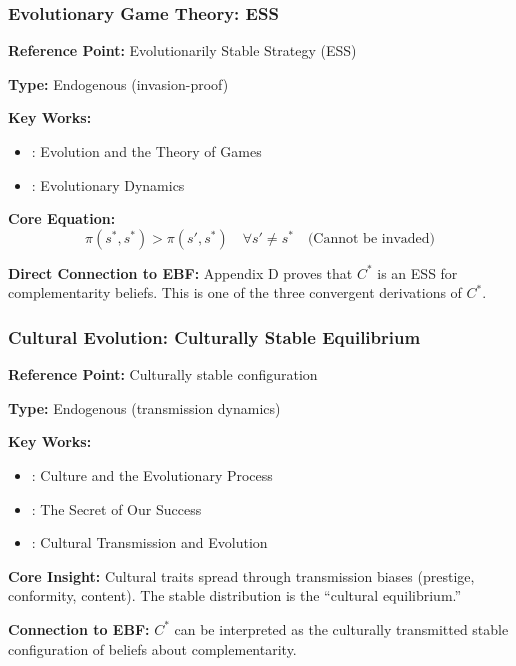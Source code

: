 \subsubsection{Evolutionary Game Theory: ESS}

\begin{tcolorbox}[colback=gray!5!white, colframe=gray!75!black]
\textbf{Reference Point:} Evolutionarily Stable Strategy (ESS)

\textbf{Type:} Endogenous (invasion-proof)

\textbf{Key Works:}
\begin{itemize}[nosep]
    \item \citet{maynardsmith1982}: Evolution and the Theory of Games
    \item \citet{nowak2006}: Evolutionary Dynamics
\end{itemize}

\textbf{Core Equation:}
\begin{equation}
\pi(s^*, s^*) > \pi(s', s^*) \quad \forall s' \neq s^* \quad \text{(Cannot be invaded)}
\end{equation}

\textbf{Direct Connection to EBF:}
Appendix D proves that $C^*$ is an ESS for complementarity beliefs.
This is one of the three convergent derivations of $C^*$.
\end{tcolorbox}

\subsubsection{Cultural Evolution: Culturally Stable Equilibrium}

\begin{tcolorbox}[colback=gray!5!white, colframe=gray!75!black]
\textbf{Reference Point:} Culturally stable configuration

\textbf{Type:} Endogenous (transmission dynamics)

\textbf{Key Works:}
\begin{itemize}[nosep]
    \item \citet{boydricherson}: Culture and the Evolutionary Process
    \item \citet{henrich2015}: The Secret of Our Success
    \item \citet{cavallisforza1981}: Cultural Transmission and Evolution
\end{itemize}

\textbf{Core Insight:}
Cultural traits spread through transmission biases (prestige, conformity, content).
The stable distribution is the ``cultural equilibrium.''

\textbf{Connection to EBF:}
$C^*$ can be interpreted as the culturally transmitted stable configuration
of beliefs about complementarity.
\end{tcolorbox}


